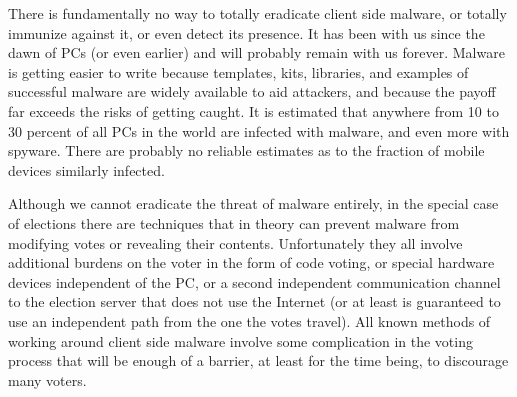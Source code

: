 
There is fundamentally no way to totally eradicate client side
malware, or totally immunize against it, or even detect its
presence. It has been with us since the dawn of PCs (or even earlier)
and will probably remain with us forever. Malware is getting easier to
write because templates, kits, libraries, and examples of successful
malware are widely available to aid attackers, and because the payoff
far exceeds the risks of getting caught. It is estimated that anywhere
from 10 to 30 percent of all PCs in the world are infected with
malware, and even more with spyware.  There are probably no reliable
estimates as to the fraction of mobile devices similarly infected.

Although we cannot eradicate the threat of malware entirely, in the
special case of elections there are techniques that in theory can
prevent malware from modifying votes or revealing their
contents. Unfortunately they all involve additional burdens on the
voter in the form of code voting, or special hardware devices
independent of the PC, or a second independent communication channel
to the election server that does not use the Internet (or at least is
guaranteed to use an independent path from the one the votes
travel). All known methods of working around client side malware
involve some complication in the voting process that will be enough of
a barrier, at least for the time being, to discourage many voters.

